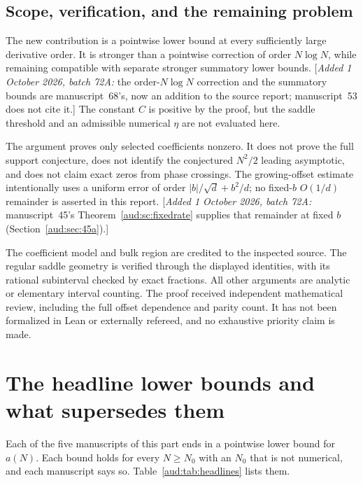 \documentclass[11pt,a4paper]{article}
\numberwithin{equation}{section}
\newcommand{\addednote}[1]{{\small[\textit{Added 1 October 2026, batch 72A:} #1]}}
\begin{document}
\subsection{Scope, verification, and the remaining problem}
The new contribution is a pointwise lower bound at every sufficiently large derivative order. It is stronger than a pointwise correction of order $N\log N$, while remaining compatible with separate stronger summatory lower bounds. \addednote{the order-$N\log N$ correction and the summatory bounds are manuscript~68\textquoteright s, now an addition to the source report; manuscript~53 does not cite it.} The constant $C$ is positive by the proof, but the saddle threshold and an admissible numerical $\eta$ are not evaluated here.

The argument proves only selected coefficients nonzero. It does not prove the full support conjecture, does not identify the conjectured $N^2/2$ leading asymptotic, and does not claim exact zeros from phase crossings. The growing-offset estimate intentionally uses a uniform error of order $|b|/\sqrt d+b^2/d$; no fixed-$b$ $O(1/d)$ remainder is asserted in this report. \addednote{manuscript~45\textquoteright s Theorem~\ref{aud:sc:fixedrate} supplies that remainder at fixed $b$ (Section~\ref{aud:sec:45a}).}

The coefficient model and bulk region are credited to the inspected source. The regular saddle geometry is verified through the displayed identities, with its rational subinterval checked by exact fractions. All other arguments are analytic or elementary interval counting. The proof received independent mathematical review, including the full offset dependence and parity count. It has not been formalized in Lean or externally refereed, and no exhaustive priority claim is made.
\section{The headline lower bounds and what supersedes them}\label{aud:sec:headlines}
Each of the five manuscripts of this part ends in a pointwise lower bound for $a(N)$. Each bound holds for every $N\ge N_0$ with an $N_0$ that is not numerical, and each manuscript says so. Table~\ref{aud:tab:headlines} lists them.
\end{document}
